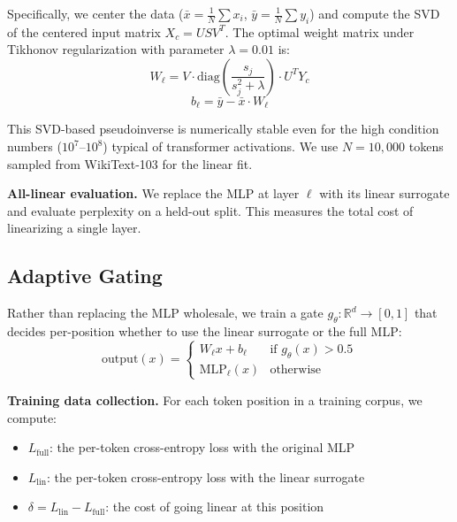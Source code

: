 \documentclass[11pt]{article}
\begin{document}
Specifically, we center the data ($\bar{x} = \frac{1}{N}\sum x_i$, $\bar{y} = \frac{1}{N}\sum y_i$) and compute the SVD of the centered input matrix $X_c = U S V^T$. The optimal weight matrix under Tikhonov regularization with parameter $\lambda = 0.01$ is:
\begin{equation}
W_\ell = V \cdot \mathrm{diag}\!\left(\frac{s_j}{s_j^2 + \lambda}\right) \cdot U^T Y_c
\end{equation}
\begin{equation}
b_\ell = \bar{y} - \bar{x} \cdot W_\ell
\end{equation}

This SVD-based pseudoinverse is numerically stable even for the high condition numbers ($10^7$--$10^8$) typical of transformer activations. We use $N = 10{,}000$ tokens sampled from WikiText-103 \citep{merity2017} for the linear fit.

\textbf{All-linear evaluation.} We replace the MLP at layer $\ell$ with its linear surrogate and evaluate perplexity on a held-out split. This measures the total cost of linearizing a single layer.

\subsection{Adaptive Gating}

Rather than replacing the MLP wholesale, we train a gate $g_\theta: \mathbb{R}^d \to [0, 1]$ that decides per-position whether to use the linear surrogate or the full MLP:
\begin{equation}
\mathrm{output}(x) = \begin{cases} W_\ell x + b_\ell & \text{if } g_\theta(x) > 0.5 \\ \mathrm{MLP}_\ell(x) & \text{otherwise} \end{cases}
\end{equation}

\textbf{Training data collection.} For each token position in a training corpus, we compute:
\begin{itemize}
    \item $L_{\mathrm{full}}$: the per-token cross-entropy loss with the original MLP
    \item $L_{\mathrm{lin}}$: the per-token cross-entropy loss with the linear surrogate
    \item $\delta = L_{\mathrm{lin}} - L_{\mathrm{full}}$: the cost of going linear at this position
\end{itemize}
\end{document}
